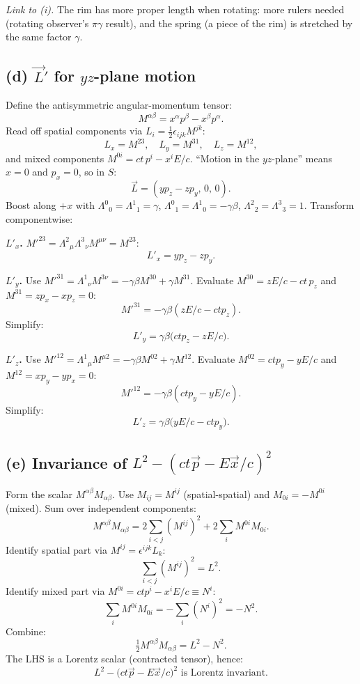 \documentclass[11pt]{article}
\begin{document}
\emph{Link to (i).} The rim has more proper length when rotating: more rulers needed (rotating observer's $\pi\gamma$ result), and the spring (a piece of the rim) is stretched by the same factor $\gamma$.

\subsection*{(d) $\vec L'$ for $yz$-plane motion}

Define the antisymmetric angular-momentum tensor:
\[ M^{\alpha\beta}=x^{\alpha}p^{\beta}-x^{\beta}p^{\alpha}. \]
Read off spatial components via $L_{i}=\tfrac{1}{2}\epsilon_{ijk}M^{jk}$:
\[ L_{x}=M^{23},\quad L_{y}=M^{31},\quad L_{z}=M^{12}, \]
and mixed components $M^{0i}=ct\,p^{i}-x^{i}E/c$. ``Motion in the $yz$-plane'' means $x=0$ and $p_{x}=0$, so in $S$:
\[ \vec L=(yp_{z}-zp_{y},\,0,\,0). \]
Boost along $+x$ with $\Lambda^{0}{}_{0}=\Lambda^{1}{}_{1}=\gamma$, $\Lambda^{0}{}_{1}=\Lambda^{1}{}_{0}=-\gamma\beta$, $\Lambda^{2}{}_{2}=\Lambda^{3}{}_{3}=1$. Transform componentwise:

\textbf{$L'_{x}$.} $M'^{23}=\Lambda^{2}{}_{\mu}\Lambda^{3}{}_{\nu}M^{\mu\nu}=M^{23}$:
\begin{equation}
\boxed{\;L'_{x}=yp_{z}-zp_{y}.\;}
\end{equation}

\textbf{$L'_{y}$.} Use $M'^{31}=\Lambda^{1}{}_{\nu}M^{3\nu}=-\gamma\beta M^{30}+\gamma M^{31}$. Evaluate $M^{30}=zE/c-ct\,p_{z}$ and $M^{31}=zp_{x}-xp_{z}=0$:
\[ M'^{31}=-\gamma\beta(zE/c-ctp_{z}). \]
Simplify:
\begin{equation}
\boxed{\;L'_{y}=\gamma\beta\big(ctp_{z}-zE/c\big).\;}
\end{equation}

\textbf{$L'_{z}$.} Use $M'^{12}=\Lambda^{1}{}_{\mu}M^{\mu 2}=-\gamma\beta M^{02}+\gamma M^{12}$. Evaluate $M^{02}=ctp_{y}-yE/c$ and $M^{12}=xp_{y}-yp_{x}=0$:
\[ M'^{12}=-\gamma\beta(ctp_{y}-yE/c). \]
Simplify:
\begin{equation}
\boxed{\;L'_{z}=\gamma\beta\big(yE/c-ctp_{y}\big).\;}
\end{equation}

\subsection*{(e) Invariance of $L^{2}-(ct\vec p-E\vec x/c)^{2}$}

Form the scalar $M^{\alpha\beta}M_{\alpha\beta}$. Use $M_{ij}=M^{ij}$ (spatial-spatial) and $M_{0i}=-M^{0i}$ (mixed). Sum over independent components:
\[ M^{\alpha\beta}M_{\alpha\beta}=2\sum_{i<j}(M^{ij})^{2}+2\sum_{i}M^{0i}M_{0i}. \]
Identify spatial part via $M^{ij}=\epsilon^{ijk}L_{k}$:
\[ \sum_{i<j}(M^{ij})^{2}=L^{2}. \]
Identify mixed part via $M^{0i}=ctp^{i}-x^{i}E/c\equiv N^{i}$:
\[ \sum_{i}M^{0i}M_{0i}=-\sum_{i}(N^{i})^{2}=-N^{2}. \]
Combine:
\[ \tfrac{1}{2}M^{\alpha\beta}M_{\alpha\beta}=L^{2}-N^{2}. \]
The LHS is a Lorentz scalar (contracted tensor), hence:
\begin{equation}
\boxed{\;L^{2}-\big(ct\vec p-E\vec x/c\big)^{2}\text{ is Lorentz invariant.}\;}
\end{equation}
\end{document}
